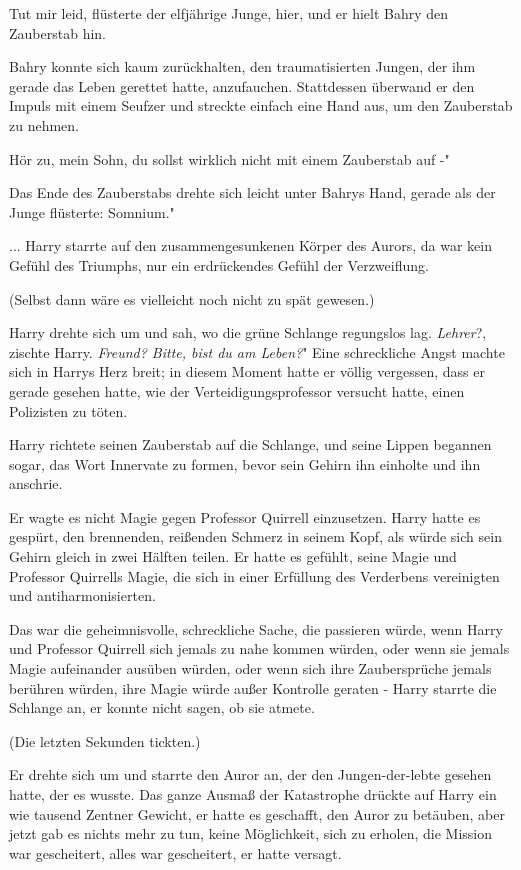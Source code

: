 \glqq Tut mir leid\grqq{}, flüsterte der elfjährige Junge, \glqq hier\grqq{},
und er hielt Bahry den Zauberstab hin.

Bahry konnte sich kaum zurückhalten, den traumatisierten Jungen, der ihm gerade
das Leben gerettet hatte, anzufauchen. Stattdessen überwand er den Impuls mit
einem Seufzer und streckte einfach eine Hand aus, um den Zauberstab zu nehmen.

\glqq Hör zu, mein Sohn, du sollst wirklich nicht mit einem Zauberstab auf -"

Das Ende des Zauberstabs drehte sich leicht unter Bahrys Hand, gerade als der
Junge flüsterte: \glqq Somnium."

... Harry starrte auf den zusammengesunkenen Körper des Aurors, da war kein
Gefühl des Triumphs, nur ein erdrückendes Gefühl der Verzweiflung.

(Selbst dann wäre es vielleicht noch nicht zu spät gewesen.)

Harry drehte sich um und sah, wo die grüne Schlange regungslos lag. \glqq
\emph{Lehrer}?\grqq{}, zischte Harry. \glqq \emph{Freund? Bitte, bist du am
Leben?}" Eine schreckliche Angst machte sich in Harrys Herz breit; in diesem
Moment hatte er völlig vergessen, dass er gerade gesehen hatte, wie der
Verteidigungsprofessor versucht hatte, einen Polizisten zu töten.

Harry richtete seinen Zauberstab auf die Schlange, und seine Lippen begannen
sogar, das Wort Innervate zu formen, bevor sein Gehirn ihn einholte und ihn
anschrie.

Er wagte es nicht Magie gegen Professor Quirrell einzusetzen. Harry hatte es
gespürt, den brennenden, reißenden Schmerz in seinem Kopf, als würde sich sein
Gehirn gleich in zwei Hälften teilen. Er hatte es gefühlt, seine Magie und
Professor Quirrells Magie, die sich in einer Erfüllung des Verderbens
vereinigten und antiharmonisierten.

Das war die geheimnisvolle, schreckliche Sache, die passieren würde, wenn Harry
und Professor Quirrell sich jemals zu nahe kommen würden, oder wenn sie jemals
Magie aufeinander ausüben würden, oder wenn sich ihre Zaubersprüche jemals
berühren würden, ihre Magie würde außer Kontrolle geraten - Harry starrte die
Schlange an, er konnte nicht sagen, ob sie atmete.

(Die letzten Sekunden tickten.)

Er drehte sich um und starrte den Auror an, der den Jungen-der-lebte gesehen
hatte, der es wusste. Das ganze Ausmaß der Katastrophe drückte auf Harry ein wie
tausend Zentner Gewicht, er hatte es geschafft, den Auror zu betäuben, aber
jetzt gab es nichts mehr zu tun, keine Möglichkeit, sich zu erholen, die Mission
war gescheitert, alles war gescheitert, er hatte versagt.

